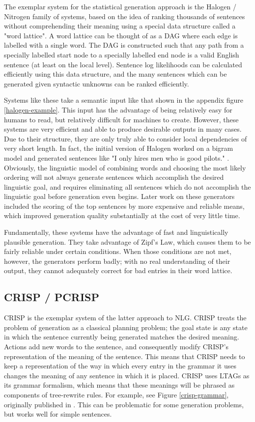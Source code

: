 The exemplar system for the statistical generation approach is the
Halogen / Nitrogen family of systems, based on the idea of
ranking thousands of sentences without comprehending their
meaning using a special data structure called a "word lattice".
A word lattice can be thought of as a DAG where each edge is
labelled with a single word.  The DAG is constructed such that
any path from a specially labelled start node to a specially labelled
end node is a valid English sentence (at least on the local level).
Sentence log likelihoods can be calculated efficiently using this
data structure, and the many sentences which can be generated
given syntactic unknowns can be ranked efficiently.

Systems like these take a semantic input like that shown in
the appendix figure \ref{halogen-example}.  This input
has the advantage of being relatively easy for humans to
read, but relatively difficult for machines to create.
However, these systems are very efficient and able
to produce desirable outputs in many cases.  Due to
their structure, they are only truly able to consider local
dependencies of very short length.  In fact, the
initial version of Halogen worked on a bigram model
and generated sentences like "I only hires men who is good 
pilots." \cite{knight_1995_genselect}.  Obviously, the
linguistic model of combining words and choosing the most likely
ordering will not always generate sentences which accomplish
the desired linguistic goal, and requires eliminating all
sentences which do not accomplish the linguistic goal
before generation even begins.  Later work on these
generators included the scoring of the top
sentences by more expensive and reliable means, which
improved generation quality substantially at the cost of
very little time.

Fundamentally, these systems have the advantage of
fast and linguistically plausible generation.  They
take advantage of Zipf's Law, which causes them
to be fairly reliable under certain conditions.  When
those conditions are not met, however, the generators perform
badly; with no real understanding of their output, they
cannot adequately correct for bad entries in their word
lattice.

\subsection{CRISP / PCRISP}

CRISP is the exemplar system of the latter approach to NLG.
CRISP treats the problem of generation as a classical planning
problem; the goal state is any state in which the sentence
currently being generated matches the desired meaning.
Actions add new words to the sentence, and consequently
modify CRISP's representation of the meaning of the sentence.
This means that CRISP needs to keep a representation of the
way in which every entry in the grammar it uses changes the
meaning of any sentence in which it is placed.
CRISP uses LTAGs as its grammar formalism,
which means that these meanings will be phrased as components
of tree-rewrite rules.  For example, see Figure \ref{crisp-grammar},
originally published in \cite{koller_experiences_2011}.
This can be problematic for some generation problems, but works well
for simple sentences.

